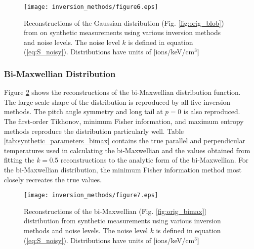 \begin{figure}[h!]
    \centering
    \texttt{[image: inversion\_methods/figure6.eps]}
    \caption{Reconstructions of the Gaussian distribution (Fig. \ref{fig:orig_blob}) from on synthetic measurements using various inversion methods and noise levels. The noise level $k$ is defined in equation (\ref{eq:S_noisy}). Distributions have units of [ions/keV/cm$^3$] } 
    \label{fig:tomos_blob}
\end{figure}

\subsubsection{Bi-Maxwellian Distribution}
Figure \ref{fig:tomos_bimax} shows the reconstructions of the bi-Maxwellian distribution function. The large-scale shape of the distribution is reproduced by all five inversion methods. The pitch angle symmetry and long tail at $p=0$ is also reproduced.
The first-order Tikhonov, minimum Fisher information, and maximum entropy methods reproduce the distribution particularly well. Table \ref{tab:synthetic_parameters_bimax} contains the true parallel and perpendicular temperatures used in calculating the bi-Maxwellian and the values obtained from fitting the $k=0.5$ reconstructions to the analytic form of the bi-Maxwellian. For the bi-Maxwellian distribution, the minimum Fisher information method most closely recreates the true values.
\begin{table}[h!]
    \caption{\label{tab:synthetic_parameters_bimax} Parameters of the bi-Maxwellian test distribution. Parameters are found by fitting the reconstructed distributions to the analytic form of the true distribution.}
\end{table}
\begin{figure}[h!]
    \centering
    \texttt{[image: inversion\_methods/figure7.eps]}
    \caption{Reconstructions of the bi-Maxwellian (Fig. \ref{fig:orig_bimax}) distribution from synthetic measurements using various inversion methods and noise levels. The noise level $k$ is defined in equation (\ref{eq:S_noisy}). Distributions have units of [ions/keV/cm$^3$] }
    \label{fig:tomos_bimax}
\end{figure}

